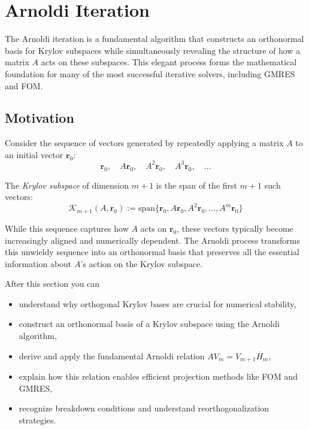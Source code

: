 \chapter{Arnoldi Iteration}
\label{chap:arnoldi}

The Arnoldi iteration is a fundamental algorithm that constructs an orthonormal basis for Krylov subspaces while simultaneously revealing the structure of how a matrix $A$ acts on these subspaces. This elegant process forms the mathematical foundation for many of the most successful iterative solvers, including GMRES and FOM.

\section{Motivation}

Consider the sequence of vectors generated by repeatedly applying a matrix $A$ to an initial vector $\mathbf{r}_0$:
\[
\mathbf{r}_0, \quad A\mathbf{r}_0, \quad A^2\mathbf{r}_0, \quad A^3\mathbf{r}_0, \quad \ldots
\]

The \emph{Krylov subspace} of dimension $m+1$ is the span of the first $m+1$ such vectors:
\[
\mathcal{K}_{m+1}(A,\mathbf{r}_0) := \text{span}\{\mathbf{r}_0, A\mathbf{r}_0, A^2\mathbf{r}_0, \ldots, A^m\mathbf{r}_0\}
\]

While this sequence captures how $A$ acts on $\mathbf{r}_0$, these vectors typically become increasingly aligned and numerically dependent. The Arnoldi process transforms this unwieldy sequence into an orthonormal basis that preserves all the essential information about $A$'s action on the Krylov subspace.

\begin{learninggoals}[title={Learning goals}]
  After this section you can
  \begin{itemize}[nosep]
    \item understand why orthogonal Krylov bases are crucial for numerical stability,
    \item construct an orthonormal basis of a Krylov subspace using the Arnoldi algorithm,
    \item derive and apply the fundamental Arnoldi relation $AV_m = V_{m+1}\overline{H}_m$,
    \item explain how this relation enables efficient projection methods like FOM and GMRES,
    \item recognize breakdown conditions and understand reorthogonalization strategies.
  \end{itemize}
\end{learninggoals}

